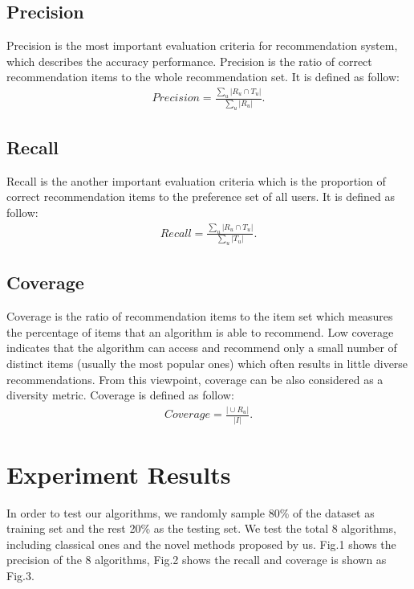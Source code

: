 \documentclass{sig-alternate}
\begin{document}
\subsection{Precision}
Precision is the most important evaluation criteria for recommendation system, which describes the accuracy performance. Precision is the ratio of correct recommendation items to the whole recommendation set.
It is defined as follow:
\begin{gather*}
Precision = \frac{\sum_{u} {\vert   R_u  \cap T_u   \vert}}   {  \sum_{u} \vert  R_u   \vert }.
\end{gather*}
\subsection{Recall}
Recall is the another important evaluation criteria which is the proportion of correct recommendation items to the preference set of all users.
It is defined as follow:
\begin{gather*}
Recall = \frac{\sum_{u} {\vert   R_u  \cap T_u   \vert}}   {  \sum_{u} \vert  T_u   \vert }.
\end{gather*}
\subsection{Coverage}
Coverage is the ratio of recommendation items to the item set which measures the percentage of items that an algorithm is able to recommend.
Low coverage indicates that the algorithm can access and recommend only a small number
of distinct items (usually the most popular ones) which often results in little diverse recommendations. From this viewpoint, coverage can be also considered as a diversity metric.
Coverage is defined as follow:
\begin{gather*}
Coverage = \frac{{\vert    \cup R_u    \vert}}   { \vert  I   \vert }.
\end{gather*}
\section{Experiment Results}
In order to test our algorithms, we randomly sample 80\% of the dataset as training set and the rest 20\% as the testing set. We test the total 8 algorithms, including classical ones and the novel methods proposed by us. Fig.1 shows the precision of the 8 algorithms, Fig.2 shows the recall and coverage is shown as Fig.3.
\end{document}
